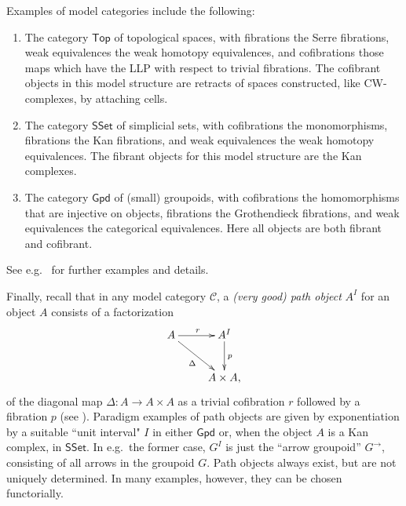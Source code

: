 \documentclass[reqno,12pt]{amsart}
\renewcommand{\to}{\rightarrow}
\newcommand{\C}{\ensuremath{\mathcal{C}}}
\theoremstyle{definition}
\theoremstyle{remark}
\begin{document}
Examples of model categories include the following:
\begin{enumerate} 
\item The category $\mathsf{Top}$ of topological spaces, with fibrations the Serre fibrations, weak 
equivalences the weak homotopy equivalences, and cofibrations those maps which 
have the LLP with respect to trivial fibrations. The cofibrant objects in this model 
structure are retracts of spaces constructed, like CW-complexes, by attaching cells. 

\item The category $\mathsf{SSet}$ of simplicial sets, with cofibrations the monomorphisms, fibrations the Kan fibrations, and weak equivalences the weak homotopy equivalences. The fibrant objects for this model structure are the Kan complexes. 

\item The category $\mathsf{Gpd}$ of (small) groupoids, with cofibrations the homomorphisms that are
injective on objects, fibrations the Grothendieck fibrations, and weak equivalences the categorical equivalences. 
Here all objects are both fibrant and cofibrant. 
\end{enumerate}
%
See e.g.\ \cite{Dwyer:HTMC,Hovey:MC} for further examples and details.

Finally, recall that in any model category $\C$, a \emph{(very good) path object}  $A^I$ for an object  $A$ consists of a factorization 
\begin{equation}\label{diag:factor_Delta}
\xymatrix{
A 
\ar[r]^r
\ar[rd]_\Delta
&
A^I 
\ar[d]^p
\\
& A\times A ,
}
\end{equation}
of the diagonal map $\Delta : A \to A \times A$ as a trivial cofibration $r$ followed by a fibration 
$p$ (see \cite{Hovey:MC}).  Paradigm examples of path objects are given by exponentiation by a suitable ``unit interval"
$I$ in either $\mathsf{Gpd}$ or, when the object $A$ is a Kan complex, in $\mathsf{SSet}$.  
In e.g.\ the former case, $G^I$ is just the ``arrow groupoid'' $G^{\rightarrow}$, consisting of all arrows in the groupoid $G$.
Path objects always exist, but are not uniquely determined.  In many examples, however, they can be chosen functorially. 
\end{document}
